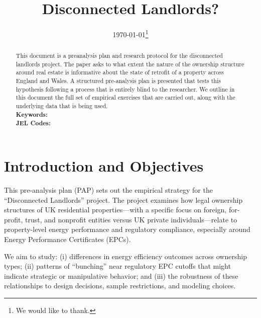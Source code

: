 \documentclass[12pt]{article}
\begin{document}
\onehalfspacing
\thispagestyle{empty}

\title{Disconnected Landlords?}
\author{
\begin{tabular}{cc}
\end{tabular}
}
\date{\today \thanks{We would like to thank.}}

\maketitle
\thispagestyle{empty}
\begin{abstract}

\noindent This document is a preanalysis plan and research protocol for the disconnected landlords project. The paper asks to what extent the nature of the ownership structure around real estate is informative about the state of retrofit of a property across England and Wales. A structured pre-analysis plan is presented that tests this hypothesis following a process that is entirely blind to the researcher. We outline in this document the full set of empirical exercises that are carried out, along with the underlying data that is being used.
\\
\noindent \textbf{Keywords:} \\
\noindent \textbf{JEL Codes:} 

\end{abstract}


\pagebreak
\section{Introduction and Objectives}

This pre-analysis plan (PAP) sets out the empirical strategy for the ``Disconnected Landlords'' project. 
The project examines how legal ownership structures of UK residential properties---with a specific focus on foreign, for-profit, trust, and nonprofit entities versus UK private individuals---relate to property-level energy performance and regulatory compliance, especially around Energy Performance Certificates (EPCs).

We aim to study:
(i) differences in energy efficiency outcomes across ownership types; 
(ii) patterns of ``bunching'' near regulatory EPC cutoffs that might indicate strategic or manipulative behavior; and 
(iii) the robustness of these relationships to design decisions, sample restrictions, and modeling choices.
\end{document}
